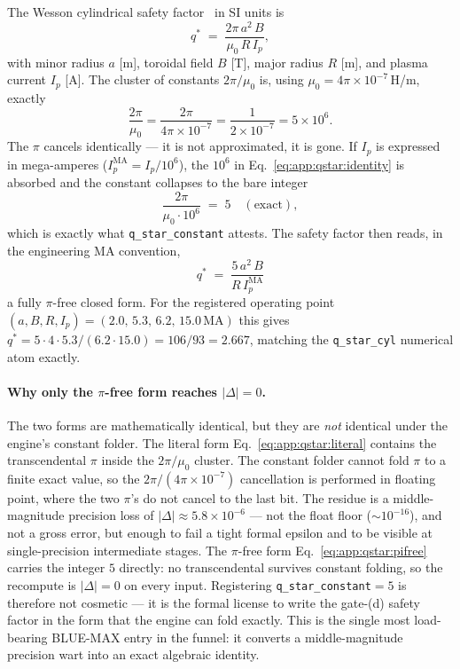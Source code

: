 The Wesson cylindrical safety factor~\citep{wesson2011tokamaks} in SI units is
\begin{equation}
q^{*} \;=\; \frac{2\pi\,a^{2}\,B}{\mu_0\,R\,I_p},
\label{eq:app:qstar:literal}
\end{equation}
with minor radius $a$ [m], toroidal field $B$ [T], major radius $R$ [m], and
plasma current $I_p$ [A]. The cluster of constants $2\pi/\mu_0$ is, using
$\mu_0 = 4\pi\times10^{-7}$\,H/m, exactly
\begin{equation}
\frac{2\pi}{\mu_0} = \frac{2\pi}{4\pi\times10^{-7}}
  = \frac{1}{2\times10^{-7}} = 5\times10^{6}.
\label{eq:app:qstar:identity}
\end{equation}
The $\pi$ cancels identically --- it is not approximated, it is gone. If $I_p$
is expressed in mega-amperes ($I_p^{\text{MA}} = I_p/10^{6}$), the $10^{6}$ in
Eq.~\eqref{eq:app:qstar:identity} is absorbed and the constant collapses to the
bare integer
\begin{equation}
\frac{2\pi}{\mu_0\cdot10^{6}} \;=\; 5 \quad(\text{exact}),
\label{eq:app:qstar:five}
\end{equation}
which is exactly what \texttt{q\_star\_constant} attests. The safety factor
then reads, in the engineering MA convention,
\begin{equation}
\boxed{\;q^{*} \;=\; \frac{5\,a^{2}\,B}{R\,I_p^{\text{MA}}}\;}
\label{eq:app:qstar:pifree}
\end{equation}
a fully $\pi$-free closed form. For the registered operating point
$(a,B,R,I_p) = (2.0,\,5.3,\,6.2,\,15.0\,\text{MA})$ this gives $q^{*} =
5\cdot4\cdot5.3/(6.2\cdot15.0) = 106/93 = 2.667$, matching the
\texttt{q\_star\_cyl} numerical atom exactly.

\paragraph{Why only the $\pi$-free form reaches $|\Delta|=0$.}
The two forms are mathematically identical, but they are \emph{not} identical
under the engine's constant folder. The literal form
Eq.~\eqref{eq:app:qstar:literal} contains the transcendental $\pi$ inside the
$2\pi/\mu_0$ cluster. The constant folder cannot fold $\pi$ to a finite exact
value, so the $2\pi/(4\pi\times10^{-7})$ cancellation is performed in
floating point, where the two $\pi$'s do not cancel to the last bit. The
residue is a middle-magnitude precision loss of $|\Delta|\approx
5.8\times10^{-6}$ --- not the float floor ($\sim10^{-16}$), and not a gross
error, but enough to fail a tight formal epsilon and to be visible at
single-precision intermediate stages. The $\pi$-free form
Eq.~\eqref{eq:app:qstar:pifree} carries the integer $5$ directly: no
transcendental survives constant folding, so the recompute is
$|\Delta|=0$ on every input. Registering \texttt{q\_star\_constant}$=5$ is
therefore not cosmetic --- it is the formal license to write the gate-(d)
safety factor in the form that the engine can fold exactly. This is the
single most load-bearing BLUE-MAX entry in the funnel: it converts a
middle-magnitude precision wart into an exact algebraic identity.

